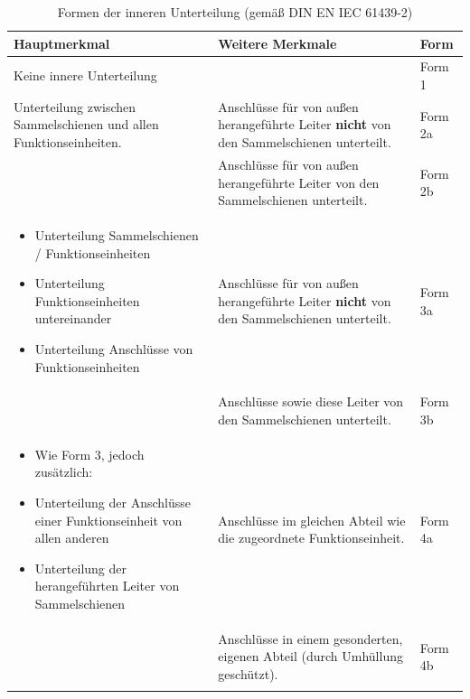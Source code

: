 \begin{table}[H]
    \centering
    \caption{Formen der inneren Unterteilung (gemäß DIN EN IEC 61439-2)}
    \vspace{0.5em}
    \renewcommand{\arraystretch}{1.5}
    \begin{tabularx}{\textwidth}{@{} >{\raggedright\arraybackslash}X >{\raggedright\arraybackslash}X l @{}}
        \toprule
        \textbf{Hauptmerkmal} & \textbf{Weitere Merkmale} & \textbf{Form} \\
        \midrule

        Keine innere Unterteilung & & Form 1 \\
        \midrule

        Unterteilung zwischen Sammelschienen und allen Funktionseinheiten. 
        & Anschlüsse für von außen herangeführte Leiter \textbf{nicht} von den Sammelschienen unterteilt. & Form 2a \\
        \cmidrule{2-3}
        & Anschlüsse für von außen herangeführte Leiter von den Sammelschienen unterteilt. & Form 2b \\
        \midrule

        \begin{itemize}[leftmargin=*, nosep, after=\vspace{-\baselineskip}]
            \item Unterteilung Sammelschienen / Funktionseinheiten
            \item Unterteilung Funktionseinheiten untereinander
            \item Unterteilung Anschlüsse von Funktionseinheiten
        \end{itemize}
        & Anschlüsse für von außen herangeführte Leiter \textbf{nicht} von den Sammelschienen unterteilt. & Form 3a \\
        \cmidrule{2-3}
        & Anschlüsse sowie diese Leiter von den Sammelschienen unterteilt. & Form 3b \\
        \midrule

        \begin{itemize}[leftmargin=*, nosep, after=\vspace{-\baselineskip}]
            \item Wie Form 3, jedoch zusätzlich:
            \item Unterteilung der Anschlüsse einer Funktionseinheit von allen anderen
            \item Unterteilung der herangeführten Leiter von Sammelschienen
        \end{itemize}
        & Anschlüsse im gleichen Abteil wie die zugeordnete Funktionseinheit. & Form 4a \\
        \cmidrule{2-3}
        & Anschlüsse in einem gesonderten, eigenen Abteil (durch Umhüllung geschützt). & Form 4b \\
        \bottomrule
        \multicolumn{3}{@{}l@{}}{\small Beispiele siehe \textcolor{blue}{Anhang BB}.} \\
    \end{tabularx}
\end{table}

